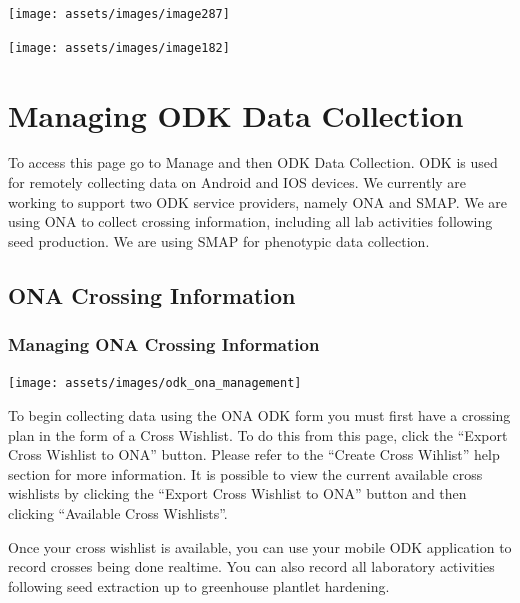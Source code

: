 \documentclass[
  12pt,
]{book}
\begin{document}
\begin{center}\texttt{[image: assets/images/image287]} \end{center}

\begin{center}\texttt{[image: assets/images/image182]} \end{center}

\hypertarget{managing-odk-data-collection}{%
\chapter{Managing ODK Data Collection}\label{managing-odk-data-collection}}

To access this page go to Manage and then ODK Data Collection. ODK is used for remotely collecting data on Android and IOS devices. We currently are working to support two ODK service providers, namely ONA and SMAP. We are using ONA to collect crossing information, including all lab activities following seed production. We are using SMAP for phenotypic data collection.

\hypertarget{ona-crossing-information}{%
\section{ONA Crossing Information}\label{ona-crossing-information}}

\hypertarget{managing-ona-crossing-information}{%
\subsection{Managing ONA Crossing Information}\label{managing-ona-crossing-information}}

\begin{center}\texttt{[image: assets/images/odk\_ona\_management]} \end{center}

To begin collecting data using the ONA ODK form you must first have a crossing plan in the form of a Cross Wishlist. To do this from this page, click the ``Export Cross Wishlist to ONA'' button. Please refer to the ``Create Cross Wihlist'' help section for more information. It is possible to view the current available cross wishlists by clicking the ``Export Cross Wishlist to ONA'' button and then clicking ``Available Cross Wishlists''.

Once your cross wishlist is available, you can use your mobile ODK application to record crosses being done realtime. You can also record all laboratory activities following seed extraction up to greenhouse plantlet hardening.
\end{document}
